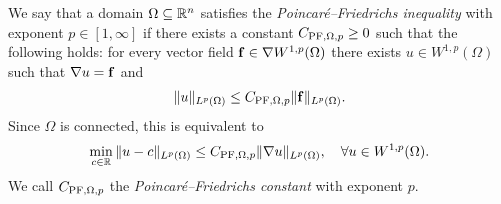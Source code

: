 \documentclass[10pt,letterpaper]{article}
\begin{document}

We say that a domain $\Omega \subseteq {\mathbb R}^{n}$ satisfies the \emph{Poincar\'e--Friedrichs inequality} with exponent $p \in [1,\infty]$
if there exists a constant $C_{{\rm PF},\Omega,p} \geq 0$ such that the following holds:
for every vector field ${\mathbf f} \in \nabla W^{1,p}(\Omega)$ there exists $u \in W^{1,p}(\Omega)$
such that $\nabla u = {\mathbf f}$ and 
\begin{align}\label{math:inequalitypf:gradient}
    \| u \|_{L^{p}(\Omega)}
    \leq 
    C_{{\rm PF},\Omega,p} 
    \| {\mathbf f} \|_{L^{p}(\Omega)}
    .
\end{align}
Since $\Omega$ is connected, this is equivalent to  
\begin{align*}
    \min_{ c \in {\mathbb R} } \| u - c \|_{L^{p}(\Omega)}
    \leq 
    C_{{\rm PF},\Omega,p} 
    \| \nabla u \|_{L^{p}(\Omega)},
    \quad 
    \forall 
    u \in W^{1,p}(\Omega)
    .
\end{align*}
We call $C_{{\rm PF},\Omega,p}$ the \emph{Poincar\'e--Friedrichs constant} with exponent $p$. 
\\
\end{document}
